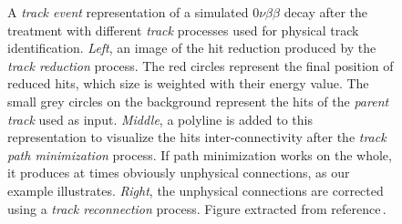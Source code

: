\begin{figure}[htb!]
\centering
    \caption{A \emph{track event} representation of a simulated $0\nu\beta\beta$ decay after the treatment with different \emph{track} processes used for physical track identification. \emph{Left}, an image of the hit reduction produced by the \emph{track reduction} process. The red circles represent the final position of reduced hits, which size is weighted with their energy value. The small grey circles on the background represent the hits of the \emph{parent track} used as input. \emph{Middle}, a polyline is added to this representation to visualize the hits inter-connectivity after the \emph{track path minimization} process. If path minimization works on the whole, it produces at times obviously unphysical connections, as our example illustrates. \emph{Right}, the unphysical connections are corrected using a \emph{track reconnection} process. Figure extracted from reference\,\cite{Galan:2019ake}.}
    \label{fig:tracklib}
\end{figure}


